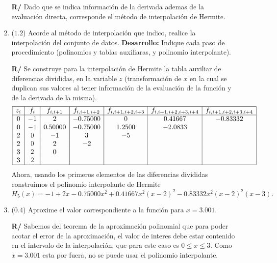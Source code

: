 \documentclass[12pt]{article}
\begin{document}
\begin{enumerate}[leftmargin=*,widest=9]
\begin{enumerate}[label=\alph*]
  \textbf{R/} Dado que se indica información de la derivada ademas de la evaluación directa, corresponde el método de interpolación de Hermite.
  
   \item (\(1.2\)) Acorde al método de interpolación que indico, realice la interpolación del conjunto de datos. \textbf{Desarrollo:} Indique cada paso de procedimiento (polinomios y tablas auxiliaras, y polinomio interpolante).
   
   
\textbf{R/} Se construye para la interpolación de Hermite la tabla auxiliar de diferencias divididas, en la variable \(z\) (transformación de \(x\) en la cual se duplican sus valores al tener información de la evaluación de la función y de la derivada de la misma).
\begin{equation*}
\begin{array}{|c|c|c|c|c|c|c|}
\hline
z_i & f_i & f_{i, i+1} & f_{i, i+1, i+2} & f_{i, i+1, i+2, i+3}& f_{i, i+1, i+2, i+3, i+4} & f_{i, i+1, i+2, i+3, i+4}\\
\hline
0 & -1 & 2       & -0.75000 & 0       & 0.41667 & -0.83332\\
0 & -1 & 0.50000 & -0.75000 & 1.2500  & -2.0833 &\\
2 & 0  & -1      & 3   & -5 &&\\
2 & 0  & 2  & -2  &&&\\
3 & 2  & 0       &&&&\\
3 & 2  &&&&&\\
\hline
\end{array}
\end{equation*}
Ahora, usando los primeros elementos de las diferencias divididas construimos el polinomio interpolante de Hermite
\[H_5(x) =-1 + 2x -0.75000x^2 + 0.41667x^2(x-2)^2-0.83332 x^2(x-2)^2(x-3). \] 
\item (\(0.4\)) Aproxime el valor correspondiente a la función para \(x=3.001\). 
   
   \textbf{R/} Sabemos del teorema de la aproximación polinomial que para poder acotar el error de la aproximación, el valor de interes debe estar contenido en el intervalo de la interpolación, que para este caso es \(0 \leq x \leq 3\). Como \(x=3.001\) esta por fuera, no se puede usar el polinomio interpolante.
   \end{enumerate}
  \end{enumerate}
\end{document}

